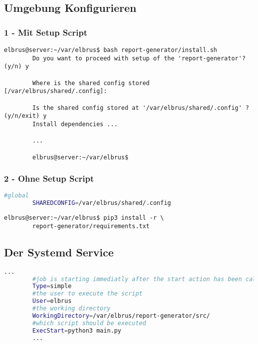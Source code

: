 	\subsection[file config]{Umgebung Konfigurieren}
	\subsubsection{1 - Mit Setup Script}
	
	\lstset{style=commands}
	\begin{lstlisting}[caption={Ausführen des 'install.sh' Scripts.}]
		elbrus@server:~/var/elbrus$ bash report-generator/install.sh
		Do you want to proceed with setup of the 'report-generator'? (y/n) y
		
		Where is the shared config stored [/var/elbrus/shared/.config]:
		
		Is the shared config stored at '/var/elbrus/shared/.config' ? (y/n/exit) y
		Install dependencies ...
		
		...
		
		elbrus@server:~/var/elbrus$
	\end{lstlisting}
	
	\subsubsection{2 - Ohne Setup Script}
	
	\lstset{style=files}
	\begin{lstlisting}[caption={Anhand von '.env.example' eigene '.env' Datei anlegen.}, language=bash]
		#global
		SHAREDCONFIG=/var/elbrus/shared/.config
	\end{lstlisting}
	
	\lstset{style=commands}
	\begin{lstlisting}[caption={Installieren von fehlenden python3 Packages.}]
		elbrus@server:~/var/elbrus$ pip3 install -r \
		report-generator/requirements.txt
	\end{lstlisting}
	\newpage
	
	\subsection[systemd service]{Der Systemd Service}
	
	\lstset{style=files}
	\begin{lstlisting}[caption={snmp-manager.service.example - Die Variable 'WorkingDirectory' sowie die Variable 'User' anpassen.},language=bash ,keywords={WorkingDirectory, User}, keywordstyle=\color{red}, firstnumber=5]
		...
		#job is starting immediatly after the start action has been called
		Type=simple
		#the user to execute the script
		User=elbrus
		#the working directory
		WorkingDirectory=/var/elbrus/report-generator/src/
		#which script should be executed
		ExecStart=python3 main.py
		...
	\end{lstlisting}
	
